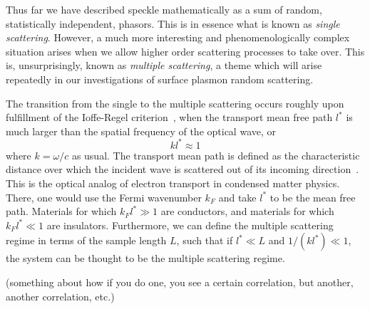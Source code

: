 Thus far we have described speckle mathematically as a sum of random,
statistically independent, phasors.  This is in essence what is known as
\textit{single scattering}.  However, a much more interesting and
phenomenologically complex situation arises when we allow higher order
scattering processes to take over.  This is, unsurprisingly, known as
\textit{multiple scattering}, a theme which will arise repeatedly in our
investigations of surface plasmon random scattering.  

The transition from the single to the multiple scattering occurs roughly upon
fulfillment of the Ioffe-Regel criterion~\cite{ioffe1960non}, when the
transport mean free path $l^*$ is much larger than the spatial frequency of
the optical wave, or
\begin{equation}
k l^* \approx 1
\end{equation}
where $k=\omega/c$ as usual.  The transport mean path is defined as the
characteristic distance over which the incident wave is scattered out of
its incoming direction~\cite{berkovits1994correlations}.  This is the
optical analog of electron transport in condensed matter physics.  There,
one would use the Fermi wavenumber $k_F$ and take $l^*$ to be the mean free
path.  Materials for which $k_F l^* \gg 1$ are conductors, and materials
for which $k_F l^* \ll 1$ are insulators.  Furthermore, we can define the
multiple scattering regime in terms of the sample length $L$, such that if
$l^* \ll L$ and $1/(k l^*) \ll 1$, the system can be thought to be the
multiple scattering regime.  

(something about how if you do one, you see a certain correlation, but
another, another correlation, etc.)
